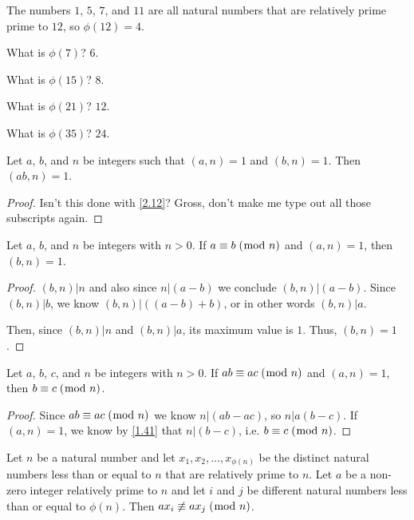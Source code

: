 \documentclass[../main.tex]{subfiles}
\begin{document}
\begin{ques} \label{4.27}
  The numbers $1$, $5$, $7$, and $11$ are all natural numbers that are relatively prime prime to $12$, so $\phi (12) = 4$.
\end{ques}

What is $\phi (7)$? $6$.

What is $\phi (15)$? $8$.

What is $\phi (21)$? $12$.

What is $\phi (35)$? $24$.



\begin{thm} \label{4.28}
  Let $a$, $b$, and $n$ be integers such that $(a, n) = 1$ and $(b, n) = 1$. Then $(ab, n) = 1$.
\end{thm}

\begin{proof}
  Isn't this done with \ref{2.12}? Gross, don't make me type out all those subscripts again.
\end{proof}



\begin{thm} \label{4.29}
  Let $a$, $b$, and $n$ be integers with $n > 0$. If $a \equiv b \; (\bmod \; n)$ and $(a, n) = 1$, then $(b, n) = 1$.
\end{thm}

\begin{proof}
  $(b, n) | n$ and also since $n | (a - b)$ we conclude $(b, n) | (a - b)$. Since $(b, n) | b$, we know $(b, n) | ((a - b) + b)$, or in other words $(b, n) | a$.

  Then, since $(b, n) | n$ and $(b, n) | a$, its maximum value is $1$. Thus, $(b, n) = 1$.
\end{proof}



\begin{thm} \label{4.30}
  Let $a$, $b$, $c$, and $n$ be integers with $n > 0$. If $ab \equiv ac \; (\bmod \; n)$ and $(a, n) = 1$, then $b \equiv c \; (\bmod \; n)$.
\end{thm}

\begin{proof}
  Since $ab \equiv ac \; (\bmod \; n)$ we know $n | (ab - ac)$, so $n | a(b-c)$. If $(a, n) = 1$, we know by \ref{1.41} that $n | (b-c)$, i.e. $b \equiv c \; (\bmod \; n)$.
\end{proof}



\pagebreak



\begin{thm} \label{4.31}
  Let $n$ be a natural number and let $x_1, x_2, \ldots, x_{\phi (n)}$ be the distinct natural numbers less than or equal to $n$ that are relatively prime to $n$. Let $a$ be a non-zero integer relatively prime to $n$ and let $i$ and $j$ be different natural numbers less than or equal to $\phi (n)$. Then $ax_i \not \equiv ax_j \; (\bmod \; n)$.
\end{thm}
\end{document}
